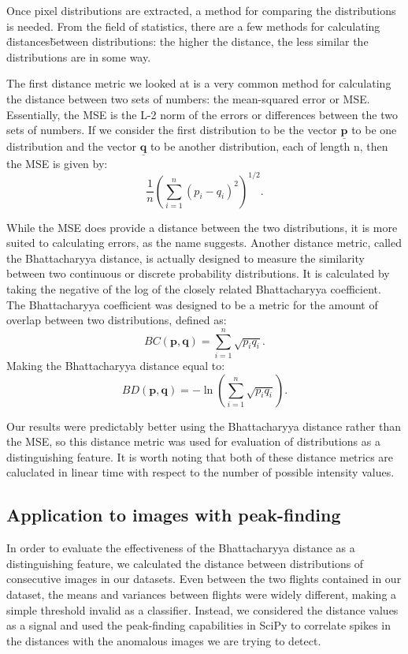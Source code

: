 Once pixel distributions are extracted, a method for comparing the distributions is needed.
From the field of statistics, there are a few methods for calculating \"distances\" between distributions: the higher the distance, the less similar the distributions are in some way.

The first distance metric we looked at is a very common method for calculating the distance between two sets of numbers: the mean-squared error or MSE.
Essentially, the MSE is the L-2 norm of the errors or differences between the two sets of numbers.
If we consider the first distribution to be the vector $\underline{\mathbf{p}}$ to be one distribution and the vector $\underline{\mathbf{q}}$ to be another distribution, each of length n, then the MSE is given by:
\begin{equation}
\frac{1}{n} \left( \sum_{i=1}^n{(p_i-q_i)^2} \right)^{1/2} .
\end{equation}

While the MSE does provide a distance between the two distributions, it is more suited to calculating errors, as the name suggests.
Another distance metric, called the Bhattacharyya distance, is actually designed to measure the similarity between two continuous or discrete probability distributions.
It is calculated by taking the negative of the log of the closely related Bhattacharyya coefficient.
The Bhattacharyya coefficient was designed to be a metric for the amount of overlap between two distributions, defined as:
\begin{equation}
BC(\mathbf{p}, \mathbf{q}) = \sum_{i=1}^n{\sqrt{p_iq_i}} .
\end{equation}
Making the Bhattacharyya distance equal to:
\begin{equation}
BD(\mathbf{p}, \mathbf{q}) = - \ln \left( \sum_{i=1}^n {\sqrt{p_iq_i}} \right) .
\end{equation}

Our results were predictably better using the Bhattacharyya distance rather than the MSE, so this distance metric was used for evaluation of distributions as a distinguishing feature.
It is worth noting that both of these distance metrics are caluclated in linear time with respect to the number of possible intensity values.


\subsection{Application to images with peak-finding}

In order to evaluate the effectiveness of the Bhattacharyya distance as a distinguishing feature, we calculated the distance between distributions of consecutive images in our datasets.
Even between the two flights contained in our dataset, the means and variances between flights were widely different, making a simple threshold invalid as a classifier.
Instead, we considered the distance values as a signal and used the peak-finding capabilities in SciPy to correlate spikes in the distances with the anomalous images we are trying to detect.

